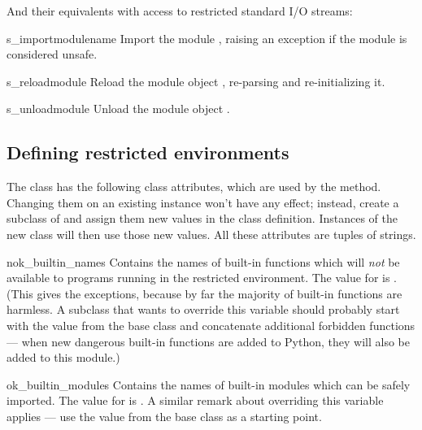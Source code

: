 And their equivalents with access to restricted standard I/O streams:

\begin{methoddesc}{s_import}{modulename}
Import the module , raising an 
exception if the module is considered unsafe.
\end{methoddesc}

\begin{methoddesc}{s_reload}{module}
Reload the module object , re-parsing and re-initializing it.  
\end{methoddesc}

\begin{methoddesc}{s_unload}{module}
Unload the module object .   
\end{methoddesc}


\subsection{Defining restricted environments \label{rexec-extension}}

The  class has the following class attributes, which are
used by the  method.  Changing them on an existing
instance won't have any effect; instead, create a subclass of
 and assign them new values in the class definition.
Instances of the new class will then use those new values.  All these
attributes are tuples of strings.

\begin{memberdesc}{nok_builtin_names}
Contains the names of built-in functions which will \emph{not} be
available to programs running in the restricted environment.  The
value for  is .
(This gives the exceptions, because by far the majority of built-in
functions are harmless.  A subclass that wants to override this
variable should probably start with the value from the base class and
concatenate additional forbidden functions --- when new dangerous
built-in functions are added to Python, they will also be added to
this module.)
\end{memberdesc}

\begin{memberdesc}{ok_builtin_modules}
Contains the names of built-in modules which can be safely imported.
The value for  is .  A similar remark about overriding this variable
applies --- use the value from the base class as a starting point.
\end{memberdesc}


